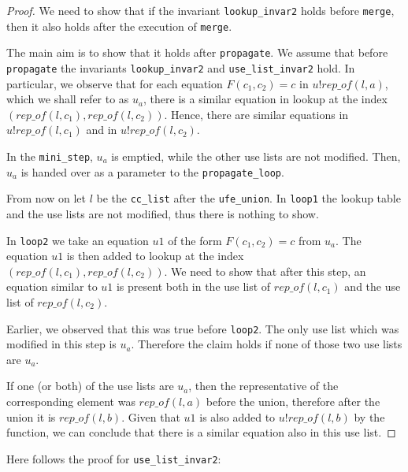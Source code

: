 \begin{proof}
We need to show that if the invariant \lstinline{lookup_invar2} holds before \lstinline{merge}, then it also holds after the execution of \lstinline|merge|.

The main aim is to show that it holds after \lstinline{propagate}.
We assume that before \lstinline{propagate} the invariants \lstinline{lookup_invar2} and \lstinline{use_list_invar2} hold.
In particular, we observe that for each equation $F(c_1, c_2) = c$ in $u ! rep\_of(l, a)$, which we shall refer to as $u_a$, there is a similar equation in lookup at the index $(rep\_of(l, c_1), rep\_of(l, c_2))$.
Hence, there are similar equations in $u ! rep\_of(l, c_1)$ and in $u ! rep\_of(l, c_2)$.

In the \lstinline{mini_step}, $u_a$ is emptied, while the other use lists are not modified. Then, $u_a$ is handed over as a parameter to the \lstinline{propagate_loop}.

From now on let $l$ be the \lstinline{cc_list} after the \lstinline{ufe_union}.
In \lstinline{loop1} the lookup table and the use lists are not modified, thus there is nothing to show.

In \lstinline{loop2} we take an equation $u1$ of the form $F(c_1, c_2) = c$ from $u_a$.
The equation $u1$ is then added to lookup at the index $(rep\_of(l, c_1), rep\_of(l, c_2))$. We need to show that after this step, an equation similar to $u1$ is present both in the use list of $rep\_of(l, c_1)$ and the use list of $rep\_of(l, c_2)$.

Earlier, we observed that this was true before \lstinline{loop2}. The only use list which was modified in this step is $u_a$. Therefore the claim holds if none of those two use lists are $u_a$.

If one (or both) of the use lists are $u_a$, then the representative of the corresponding element was $rep\_of(l,a)$ before the union, therefore after the union it is $rep\_of(l,b)$. Given that $u1$ is also added to $u ! rep\_of(l, b)$ by the function, we can conclude that there is a similar equation also in this use list.
\end{proof}

Here follows the proof for \lstinline{use_list_invar2}:

